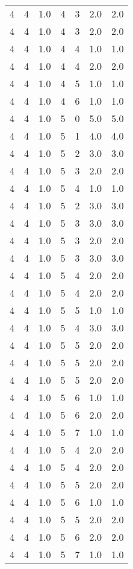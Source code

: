 \documentclass[a4paper,12pt]{article}
\begin{document}
\begin{center}
\begin{longtable}{ c c c | c c c | c }
        4 & 4 & 1.0 & 4 & 3 & 2.0 & 2.0 \\
        4 & 4 & 1.0 & 4 & 3 & 2.0 & 2.0 \\
        4 & 4 & 1.0 & 4 & 4 & 1.0 & 1.0 \\
        4 & 4 & 1.0 & 4 & 4 & 2.0 & 2.0 \\
        4 & 4 & 1.0 & 4 & 5 & 1.0 & 1.0 \\
        4 & 4 & 1.0 & 4 & 6 & 1.0 & 1.0 \\
        4 & 4 & 1.0 & 5 & 0 & 5.0 & 5.0 \\
        4 & 4 & 1.0 & 5 & 1 & 4.0 & 4.0 \\
        4 & 4 & 1.0 & 5 & 2 & 3.0 & 3.0 \\
        4 & 4 & 1.0 & 5 & 3 & 2.0 & 2.0 \\
        4 & 4 & 1.0 & 5 & 4 & 1.0 & 1.0 \\
        4 & 4 & 1.0 & 5 & 2 & 3.0 & 3.0 \\
        4 & 4 & 1.0 & 5 & 3 & 3.0 & 3.0 \\
        4 & 4 & 1.0 & 5 & 3 & 2.0 & 2.0 \\
        4 & 4 & 1.0 & 5 & 3 & 3.0 & 3.0 \\
        4 & 4 & 1.0 & 5 & 4 & 2.0 & 2.0 \\
        4 & 4 & 1.0 & 5 & 4 & 2.0 & 2.0 \\
        4 & 4 & 1.0 & 5 & 5 & 1.0 & 1.0 \\
        4 & 4 & 1.0 & 5 & 4 & 3.0 & 3.0 \\
        4 & 4 & 1.0 & 5 & 5 & 2.0 & 2.0 \\
        4 & 4 & 1.0 & 5 & 5 & 2.0 & 2.0 \\
        4 & 4 & 1.0 & 5 & 5 & 2.0 & 2.0 \\
        4 & 4 & 1.0 & 5 & 6 & 1.0 & 1.0 \\
        4 & 4 & 1.0 & 5 & 6 & 2.0 & 2.0 \\
        4 & 4 & 1.0 & 5 & 7 & 1.0 & 1.0 \\
        4 & 4 & 1.0 & 5 & 4 & 2.0 & 2.0 \\
        4 & 4 & 1.0 & 5 & 4 & 2.0 & 2.0 \\
        4 & 4 & 1.0 & 5 & 5 & 2.0 & 2.0 \\
        4 & 4 & 1.0 & 5 & 6 & 1.0 & 1.0 \\
        4 & 4 & 1.0 & 5 & 5 & 2.0 & 2.0 \\
        4 & 4 & 1.0 & 5 & 6 & 2.0 & 2.0 \\
        4 & 4 & 1.0 & 5 & 7 & 1.0 & 1.0 \\

\end{longtable}
\end{center}
\end{document}
